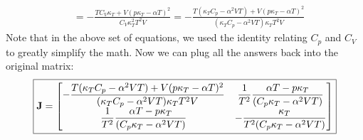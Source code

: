 {\begin{align*}
    &= -\frac{T C_V \kappa_T + V(p\kappa_T - \alpha T)^2}{C_V\kappa_T^2 T^2 V}
    = -\frac{T (\kappa_T C_p - \alpha^2VT) + V(p\kappa_T - \alpha T)^2}{(\kappa_T C_p - \alpha^2VT)\kappa_T T^2 V}
\end{align*}
Note that in the above set of equations, we used the identity relating $C_p$ and $C_V$ to greatly simplify the math. Now we can plug all the answers back into the original matrix:
\renewcommand\arraystretch{3}
\[\boxed{\bf{J} 	= 
		\begin{bmatrix} 
          -\dfrac{T (\kappa_T C_p - \alpha^2VT) + V(p\kappa_T - \alpha T)^2}{(\kappa_T C_p - \alpha^2VT)\kappa_T T^2 V} & 
          \dfrac{1}{T^2}\dfrac{\alpha T-p\kappa_T}{(C_p\kappa_T-\alpha^2 VT)} \\
          \dfrac{1}{T^2}\dfrac{\alpha T-p\kappa_T}{(C_p\kappa_T-\alpha^2 VT)} &
          -\dfrac{\kappa_T}{T^2(C_p\kappa_T-\alpha^2VT)}
        \end{bmatrix}}
\]
\renewcommand\arraystretch{1} 
\newpage }



